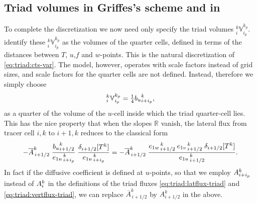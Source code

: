 \subsection{Triad volumes in Griffes's scheme and in \NEMO}
To complete the discretization we now need only specify the triad
volumes $_i^k\mathbb{V}_{i_p}^{k_p}$. \citet{Griffies_al_JPO98} identify
these $_i^k\mathbb{V}_{i_p}^{k_p}$ as the volumes of the quarter
cells, defined in terms of the distances between $T$, $u$,$f$ and
$w$-points. This is the natural discretization of
\eqref{eq:triad:cts-var}. The \NEMO model, however, operates with scale
factors instead of grid sizes, and scale factors for the quarter
cells are not defined. Instead, therefore we simply choose
\begin{equation}
  \label{eq:triad:V-NEMO}
  _i^k\mathbb{V}_{i_p}^{k_p}=\textstyle\frac{1}{4} {b_u}_{i+i_p}^k,
\end{equation}
as a quarter of the volume of the $u$-cell inside which the triad
quarter-cell lies. This has the nice property that when the slopes
$\mathbb{R}$ vanish, the lateral flux from tracer cell $i,k$ to
$i+1,k$ reduces to the classical form
\begin{equation}
  \label{eq:triad:lat-normal}
-\overline{{A}}_{\,i+1/2}^k\;
\frac{{b_u}_{i+1/2}^k}{{e_{1u}}_{\,i + i_p}^{\,k}}
\;\frac{\delta_{i+ 1/2}[T^k] }{{e_{1u}}_{\,i + i_p}^{\,k}}
 = -\overline{{A}}_{\,i+1/2}^k\;\frac{{e_{1w}}_{\,i + 1/2}^{\,k}\:{e_{1v}}_{\,i + 1/2}^{\,k}\;\delta_{i+ 1/2}[T^k]}{{e_{1u}}_{\,i + 1/2}^{\,k}}.
\end{equation}
In fact if the diffusive coefficient is defined at $u$-points, so that
we employ ${A}_{i+i_p}^k$ instead of  ${A}_i^k$ in the definitions of the
triad fluxes \eqref{eq:triad:latflux-triad} and \eqref{eq:triad:vertflux-triad},
we can replace $\overline{A}_{\,i+1/2}^k$ by $A_{i+1/2}^k$ in the above.

